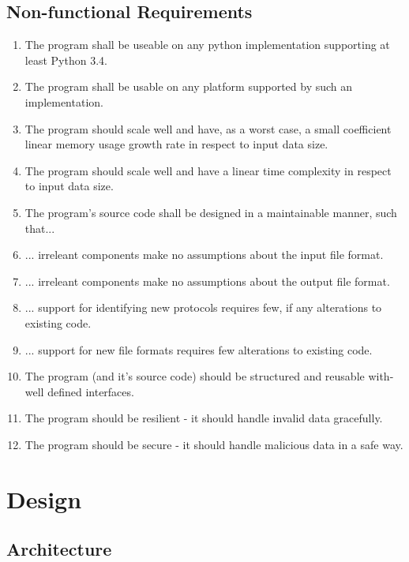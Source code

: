 \documentclass[10pt,a4paper,notitlepage]{report}
\begin{document}
\section{Non-functional Requirements}

\begin{enumerate}[label=\bfseries NFR\arabic*:]
\item \label{nfr:1} The program shall be useable on any python implementation supporting at least Python 3.4.
\item \label{nfr:2} The program shall be usable on any platform supported by such an implementation.
\item \label{nfr:3} The program should scale well and have, as a worst case, a small coefficient linear memory usage growth rate in respect to input data size.
\item \label{nfr:4} The program should scale well and have a linear time complexity in respect to input data size.
\item \label{nfr:5} The program's source code shall be designed in a maintainable manner, such that...
\item \label{nfr:6} ... irreleant components make no assumptions about the input file format.
\item \label{nfr:7} ... irreleant components make no assumptions about the output file format.
\item \label{nfr:8} ... support for identifying new protocols requires few, if any alterations to existing code.
\item \label{nfr:9} ... support for new file formats requires few alterations to existing code.
\item \label{nfr:10} The program (and it's source code) should be structured and reusable with-well defined interfaces.
\item \label{nfr:11} The program should be resilient - it should handle invalid data gracefully.
\item \label{nfr:12} The program should be secure - it should handle malicious data in a safe way.
\end{enumerate}

\chapter{Design}
\section{Architecture}
\end{document}
